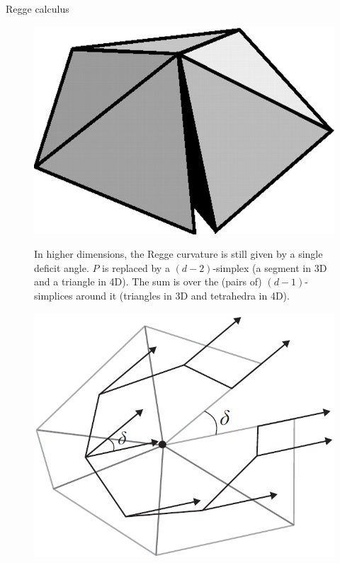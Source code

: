 \documentclass[12pt,titlepage]{article}
\begin{document}
\begin{frame}{Regge calculus}
    \begin{list}{\,}{\leftmargin=1em \itemindent=0em}
        \item<1-> \noindent\FloatBarrier
        \begin{figure}[!ht]
            \begin{minipage}{0.25\linewidth}
                \includegraphics[width=\linewidth]{4.4}
                \caption{}
                \label{fig:4.4}
            \end{minipage}
            \begin{minipage}{0.75\linewidth}
                In higher dimensions, the Regge curvature is still given by a single deficit angle. $P$ is replaced by a $(d-2)$-simplex (a segment in 3D and a triangle in 4D). The sum is over the (pairs of) $(d-1)$-simplices around it (triangles in 3D and tetrahedra in 4D).
            \end{minipage}
        \end{figure}\FloatBarrier
        \item<2-> \noindent\FloatBarrier
        \begin{figure}[!ht]
            \begin{minipage}{0.3\linewidth}
                \includegraphics[width=\linewidth]{4.5}

\end{minipage}
\end{figure}
\end{list}
\end{frame}
\end{document}
